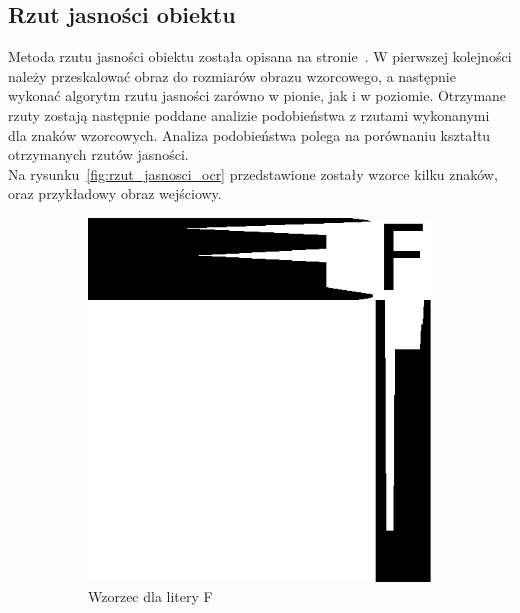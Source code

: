 \subsection{Rzut jasności obiektu}
Metoda rzutu jasności obiektu została opisana na stronie~\pageref{ssec:rzut_jasnosci}. W pierwszej kolejności należy przeskalować obraz do rozmiarów obrazu wzorcowego, a następnie wykonać algorytm rzutu jasności zarówno w pionie, jak i w poziomie. Otrzymane rzuty zostają następnie poddane analizie podobieństwa z rzutami wykonanymi dla znaków wzorcowych. Analiza podobieństwa polega na porównaniu kształtu otrzymanych rzutów jasności. \\
Na rysunku~\ref{fig:rzut_jasnosci_ocr} przedstawione zostały wzorce kilku znaków, oraz przykładowy obraz wejściowy.

\begin{figure}
  \centering
  \begin{subfigure}[b]{0.42\textwidth}
    \includegraphics[width=\textwidth]{img/rzut-wzorzec-F}
    \caption{Wzorzec dla litery F}
    \label{fig:rzut_wzorzec_F}
  \end{subfigure}
  ~
  \begin{subfigure}[b]{0.42\textwidth}

\end{subfigure}
\end{figure}
